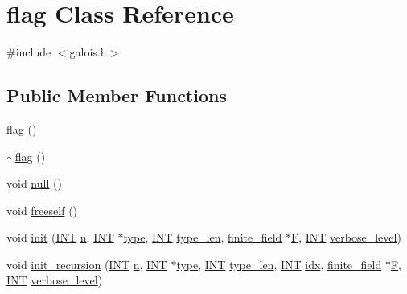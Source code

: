 \hypertarget{classflag}{}\section{flag Class Reference}
\label{classflag}


{\ttfamily \#include $<$galois.\+h$>$}

\subsection*{Public Member Functions}
\begin{DoxyCompactItemize}
\item 
\mbox{\hyperlink{classflag_a5b95682242e4c94655ee217be26e20d2}{flag}} ()
\item 
\mbox{\hyperlink{classflag_a9149bfdf4e5ec69255d353088869e9a0}{$\sim$flag}} ()
\item 
void \mbox{\hyperlink{classflag_aca06508fba1f69355f26c2e4cfc1f9b7}{null}} ()
\item 
void \mbox{\hyperlink{classflag_ade1fe610c12390f167cd1d3691a141c1}{freeself}} ()
\item 
void \mbox{\hyperlink{classflag_a1a6bdc10c3a544607a7a3a6672e3c773}{init}} (\mbox{\hyperlink{galois_8h_a09fddde158a3a20bd2dcadb609de11dc}{I\+NT}} \mbox{\hyperlink{classflag_abf9ddf5f3ac458ab8bcfbec879ffcf95}{n}}, \mbox{\hyperlink{galois_8h_a09fddde158a3a20bd2dcadb609de11dc}{I\+NT}} $\ast$\mbox{\hyperlink{classflag_a704364aedcf79da39e9a41391602fd92}{type}}, \mbox{\hyperlink{galois_8h_a09fddde158a3a20bd2dcadb609de11dc}{I\+NT}} \mbox{\hyperlink{classflag_a5c21f6e2775ed149670dc0ceacf3df7f}{type\+\_\+len}}, \mbox{\hyperlink{classfinite__field}{finite\+\_\+field}} $\ast$\mbox{\hyperlink{classflag_a32217a9c8e1d3d02b0177d6ec8158a2a}{F}}, \mbox{\hyperlink{galois_8h_a09fddde158a3a20bd2dcadb609de11dc}{I\+NT}} \mbox{\hyperlink{simeon_8_c_a818073fbcc2f439e7c56952f67386122}{verbose\+\_\+level}})
\item 
void \mbox{\hyperlink{classflag_a25c6b69bd5cc648bba8bea35a3f88369}{init\+\_\+recursion}} (\mbox{\hyperlink{galois_8h_a09fddde158a3a20bd2dcadb609de11dc}{I\+NT}} \mbox{\hyperlink{classflag_abf9ddf5f3ac458ab8bcfbec879ffcf95}{n}}, \mbox{\hyperlink{galois_8h_a09fddde158a3a20bd2dcadb609de11dc}{I\+NT}} $\ast$\mbox{\hyperlink{classflag_a704364aedcf79da39e9a41391602fd92}{type}}, \mbox{\hyperlink{galois_8h_a09fddde158a3a20bd2dcadb609de11dc}{I\+NT}} \mbox{\hyperlink{classflag_a5c21f6e2775ed149670dc0ceacf3df7f}{type\+\_\+len}}, \mbox{\hyperlink{galois_8h_a09fddde158a3a20bd2dcadb609de11dc}{I\+NT}} \mbox{\hyperlink{classflag_a756f878c42eebec879fb22b80f74d07a}{idx}}, \mbox{\hyperlink{classfinite__field}{finite\+\_\+field}} $\ast$\mbox{\hyperlink{classflag_a32217a9c8e1d3d02b0177d6ec8158a2a}{F}}, \mbox{\hyperlink{galois_8h_a09fddde158a3a20bd2dcadb609de11dc}{I\+NT}} \mbox{\hyperlink{simeon_8_c_a818073fbcc2f439e7c56952f67386122}{verbose\+\_\+level}})

\end{DoxyCompactItemize}
